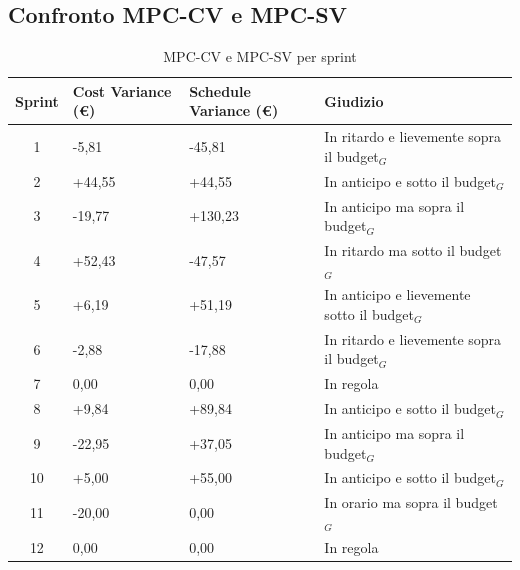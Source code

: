 \documentclass[a4paper, 10pt, colorlinks=true, linkcolor=black, urlcolor=blue, citecolor=blue, hidelinks]{article}
\begin{document}
\subsection{Confronto MPC-CV e MPC-SV}
\begin{table}[H]
    \centering
	\begin{tabular}{|c|l|l|p{3cm}|}
		\hline
		\textbf{Sprint} & \textbf{Cost Variance (€)} & \textbf{Schedule Variance (€)} & \textbf{Giudizio} \\
		\hline
		1 & -5,81 & -45,81 & In ritardo e lievemente sopra il budget$_G$\\ 
		\hline
        2 & +44,55 & +44,55 & In anticipo e sotto il budget$_G$ \\
        \hline
        3 & -19,77 & +130,23 & In anticipo ma sopra il budget$_G$ \\
        \hline
        4 & +52,43 & -47,57 & In ritardo ma sotto il budget$_G$ \\
        \hline
        5 & +6,19 & +51,19 & In anticipo e lievemente sotto il budget$_G$ \\
        \hline
        6 & -2,88 & -17,88 & In ritardo e lievemente sopra il budget$_G$ \\
        \hline
        7 & 0,00 & 0,00 & In regola \\
        \hline
        8 & +9,84 & +89,84 & In anticipo e sotto il budget$_G$ \\
        \hline
        9 & -22,95 & +37,05 & In anticipo ma sopra il budget$_G$ \\
        \hline
        10 & +5,00 & +55,00 & In anticipo e sotto il budget$_G$ \\
        \hline
        11 & -20,00 & 0,00 & In orario ma sopra il budget$_G$ \\
        \hline
        12 & 0,00 & 0,00 & In regola \\
        \hline
	\end{tabular}
	\caption{MPC-CV e MPC-SV per sprint}
	\label{tab:cv-sv}
\end{table}
\end{document}
